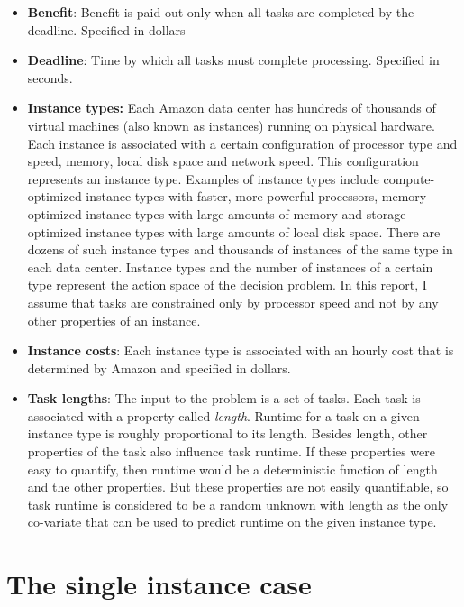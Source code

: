 \documentclass[12pt]{report}
\begin{document}
\begin{itemize}

\item \textbf{Benefit}: Benefit is paid out only when all tasks are completed by the deadline. Specified in dollars
\item \textbf{Deadline}: Time by which all tasks must complete processing. Specified in seconds.

\item \textbf{Instance types:}
Each Amazon data center has hundreds of thousands of virtual machines  (also known as instances) \cite{AWS:EC2} running on physical hardware.
Each instance is associated with a certain configuration of processor type and speed, memory, local disk space and network speed.
This configuration represents an instance type.
Examples of instance types include compute-optimized instance types with faster, more powerful processors, memory-optimized instance types with large amounts of memory and storage-optimized instance types with large amounts of local disk space.
There are dozens of such instance types and thousands of instances of the same type in each data center.
Instance types and the number of instances of a certain type represent the action space of the decision problem.
In this report, I assume that tasks are constrained only by processor speed and not by any other properties of an instance.

\item \textbf{Instance costs}: Each instance type is associated with an hourly cost that is determined by Amazon and specified in dollars. 

\item \textbf{Task lengths}:
The input to the problem is a set of tasks.
Each task is associated with a property called \textit{length}.
Runtime for a task on a given instance type is roughly proportional to its length.
Besides length, other properties of the task also influence task runtime.
If these properties were easy to quantify, then runtime would be a deterministic function of length and the other properties.
But these properties are not easily quantifiable, so task runtime is considered to be a random unknown with length as the only co-variate that can be used to predict runtime on the given instance type.

\end{itemize}

\chapter{The single instance case}
\end{document}
